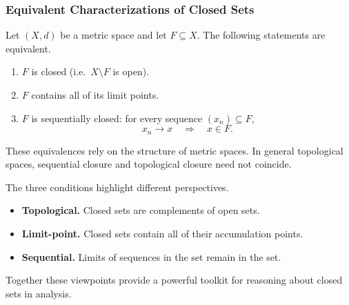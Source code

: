\subsubsection{Equivalent Characterizations of Closed Sets}

\begin{theorem}
\label{thm:closed-equiv}
Let $(X,d)$ be a metric space and let $F \subseteq X$.
The following statements are equivalent.

\begin{enumerate}[label=(\roman*)]
\item $F$ is closed (i.e.\ $X \setminus F$ is open).

\item $F$ contains all of its limit points.

\item $F$ is sequentially closed: for every sequence
      $(x_n) \subseteq F$,
      \[
        x_n \to x \quad\Rightarrow\quad x \in F.
      \]
\end{enumerate}
\end{theorem}

\begin{remark}
These equivalences rely on the structure of metric spaces.
In general topological spaces, sequential closure and topological
closure need not coincide.
\end{remark}

\begin{remark}[Interpretation]
The three conditions highlight different perspectives.
\begin{itemize}
\item \textbf{Topological.} Closed sets are complements of open sets.
\item \textbf{Limit-point.} Closed sets contain all of their
      accumulation points.
\item \textbf{Sequential.} Limits of sequences in the set remain
      in the set.
\end{itemize}
Together these viewpoints provide a powerful toolkit for reasoning
about closed sets in analysis.
\end{remark}


